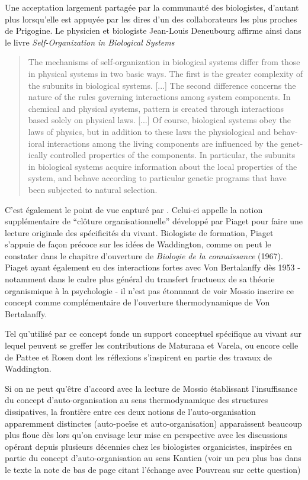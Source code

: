 Une acceptation largement partagée par la communauté des biologistes, d'autant plus lorsqu'elle est appuyée par les dires d'un des collaborateurs les plus proches de Prigogine. Le physicien et biologiste Jean-Louis Deneubourg affirme ainsi dans le livre \textit{Self-Organization in Biological Systems} \foreignblockquote{english}[{\cite[12-13]{Camazine2003}}]{The mechanisms of self-organization in biological systems differ from those in physical systems in two basic ways. The first is the greater complexity of the subunits in biological systems. [...] The second difference concerns the nature of the rules governing interactions among system components. In chemical and physical systems, pattern is created through interactions based solely on physical laws. [...] Of course, biological systems obey the laws of physics, but in addition to these laws the physiological and behavioral interactions among the living components are influenced by the genetically controlled properties of the components. In particular, the subunits in biological systems acquire information about the local properties of the system, and behave according to particular genetic programs that have been subjected to natural selection.} 

C'est également le point de vue capturé par \textcite{Mossio2014}. Celui-ci appelle la notion supplémentaire de \enquote{clôture organisationnelle} développé par Piaget pour faire une lecture originale des spécificités du vivant. Biologiste de formation, Piaget s'appuie de façon précoce sur les idées de Waddington, comme on peut le constater dans le chapitre d'ouverture de \textit{Biologie de la connaissance} (1967). Piaget ayant également eu des interactions fortes avec Von Bertalanffy dès 1953 \autocite[310-311]{Pouvreau2013} - notamment dans le cadre plus général du transfert fructueux de sa théorie organismique à la psychologie \autocite[945-951]{Pouvreau2013} - il n'est pas étonnnant de voir Mossio inscrire ce concept comme complémentaire de l'ouverture thermodynamique de Von Bertalanffy.

Tel qu'utilisé par \textcite{Mossio2014} ce concept fonde un support conceptuel spécifique au vivant sur lequel peuvent se greffer les contributions de Maturana et Varela, ou encore celle de Pattee et Rosen dont les réflexions s'inspirent en partie des travaux de Waddington.

Si on ne peut qu'être d'accord avec la lecture de Mossio établissant l'insuffisance du concept d'auto-organisation au sens thermodynamique des structures dissipatives, la frontière entre ces deux notions de l'auto-organisation apparemment distinctes (auto-poeïse et auto-organisation) apparaissent beaucoup plus floue dès lors qu'on envisage leur mise en perspective avec les discussions opérant depuis plusieurs décennies chez les biologistes organicistes, inspirées en partie du concept d'auto-organisation au sens Kantien \autocites[76-78]{Pouvreau2013} (voir un peu plus bas dans le texte la note de bas de page citant l'échange avec Pouvreau sur cette question)

